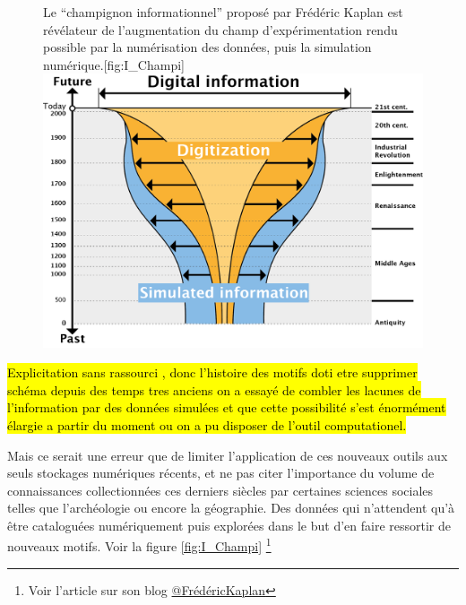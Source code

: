 \begin{figure}[!h]
\begin{sidecaption}[fortoc]{Le \enquote{champignon informationnel} proposé par Frédéric Kaplan est révélateur de l'augmentation du champ d'expérimentation rendu possible par la numérisation des données, puis la simulation numérique.}[fig:I_Champi]
 \centering
 \includegraphics[width=\linewidth]{champignonKaplan.png}
  \end{sidecaption}
\end{figure}

\hl{Explicitation sans rassourci , donc l'histoire des motifs doti etre supprimer
schéma depuis des temps tres anciens on a essayé de combler les lacunes de l'information par des données simulées et que cette possibilité s'est énormément élargie a partir du moment ou on a pu disposer de l'outil computationel.}

Mais ce serait une erreur que de limiter l'application de ces nouveaux outils aux seuls stockages numériques récents, et ne pas citer l'importance du volume de connaissances collectionnées ces derniers siècles par certaines sciences sociales telles que l'archéologie ou encore la géographie. Des données qui n'attendent qu'à être cataloguées numériquement puis explorées dans le but d'en faire ressortir de nouveaux motifs. Voir la figure \ref{fig:I_Champi} \footnote{Voir l'article sur son blog \href{http://fkaplan.wordpress.com/2013/03/14/lancement-de-la-venice-time-machine/}{@FrédéricKaplan}}


